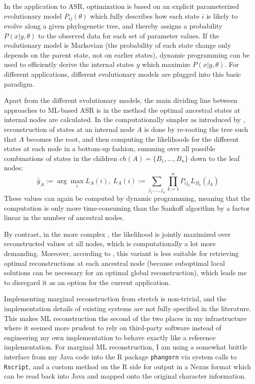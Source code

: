 In the application to ASR, optimization is based on an explicit parameterized evolutionary model $P_{ij}(\theta)$ which fully describes how each state $i$ is likely to evolve along a given phylogenetic tree, and thereby assigns a probability $P(x|y,\theta)$ to the observed data for each set of parameter values. If the evolutionary model is Markovian (the probability of each state change only depends on the parent state, not on earlier states), dynamic programming can be used to efficiently derive the internal states $y$ which maximize $P(x|y,\theta)$. For different applications, different evolutionary models are plugged into this basic paradigm.

Apart from the different evolutionary models, the main dividing line between approaches to ML-based ASR is in the method the optimal ancestral states at internal nodes are calculated. In the computationally simpler  as introduced by \cite{yang_ea_1995}, reconstruction of states at an internal node $A$ is done by re-rooting the tree such that $A$ becomes the root, and then computing the likelihoods for the different states at each node in a bottom-up fashion, summing over all possible combinations of states in the children $ch(A) = \{B_1,\dots,B_n\}$ down to the leaf nodes:
\begin{equation*}
 \hat{y}_A :=  \arg \max_i L_A(i),\ L_A(i) := \sum_{j_1,\dots,j_n} \prod_{k=1}^n P_{ij_k}L_{B_k}(j_k)
\end{equation*}
These values can again be computed by dynamic programming, meaning that the computation is only more time-consuming than the Sankoff algorithm by a factor linear in the number of ancestral nodes.

By contrast, in the more complex , the likelihood is jointly maximized over reconstructed values at all nodes, which is computationally a lot more demanding. Moreover, according to \cite{yang_ea_1995}, this variant is less suitable for retrieving optimal reconstructions at each ancestral node (because suboptimal local solutions can be necessary for an optimal global reconstruction), which leads me to disregard it as an option for the current application.

Implementing marginal reconstruction from stretch is non-trivial, and the implementation details of existing systems are not fully specified in the literature. This makes ML reconstruction the second of the two places in my infrastructure where it seemed more prudent to rely on third-party software instead of engineering my own implementation to behave exactly like a reference implementation. For marginal ML reconstruction, I am using a somewhat brittle interface from my Java code into the R package \texttt{phangorn} via system calls to \texttt{Rscript}, and a custom method on the R side for output in a Nexus format which can be read back into Java and mapped onto the original character information.

